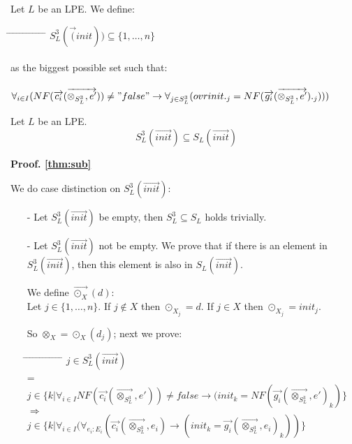 \index{}\documentclass[a4paper,10pt]{article}
\theoremstyle{plain}
\theoremstyle{definition}
\newcommand{\ovr}{\overrightarrow}
\newcommand{\tb}{\textbf}
\newcommand{\tab}{\hspace*{5.mm} \= \hspace*{5.mm} \= \hspace*{5.mm} \= \hspace*{5.mm} \= \hspace*{5.mm} \= \hspace*{5.mm}  \= \hspace*{5.mm}  \= \hspace*{5.mm}  \= \hspace*{5.mm} \= \hspace*{5.mm} \= \hspace*{5.mm}  \= \hspace*{5.mm}  \= \hspace*{5.mm}\kill}
\begin{document}
\begin{defn} \label{def:sug3} Let $L$ be an LPE. We define:%

\begin{tabbing}
\tab
\> $ S_L^3(\ovr(init)) \subseteq \lbrace 1, \ldots, n \rbrace $ \\ \\
 \> as the biggest possible set such that:\\ \\
\> $\forall_{i \in I} (NF( \ovr{c_i} ( \ovr{\otimes_{S_L^3}, e'} ) ) \not= "false" \rightarrow \forall_{j \in S_L^3}(ovr{init}._j =  NF( \ovr{g_i}(\ovr{\otimes_{S_L^3}, e'} )._j))) $
\end{tabbing}
\begin{thm} Let $L$ be an LPE. \label{thm:sub}
$$S_L^3(\ovr{init}) \subseteq S_L(\ovr{init}) $$
\end{thm} 
\begin{flushleft}
\tb{Proof. \ref{thm:sub}}
\end{flushleft}
We do case distinction on $S_L^3(\ovr{init})$:\\
\begin{itemize}
\item[-] Let $S_L^3(\ovr{init})$ be empty, then $S_L^3 \subseteq S_L$ holds trivially.
\item[-] Let $S_L^3(\ovr{init})$ not be empty. We prove that if there is an element in $S_L^3(\ovr{init})$, then this element is also in $S_L(\ovr{init})$.
\begin{defn} We define $\ovr{\odot_X}(d)$:\\
Let $j \in \lbrace 1, \dots, n \rbrace $. 
If $j \not\in X$ then $\odot_{X_j} = d$. 
If $j \in X$ then $\odot_{X_j} = init_j$.
\end{defn}
So $\otimes_X = \odot_X(d_j)$; next we prove:
\begin{tabbing}
\tab
\> \> $j \in S_L^3(\ovr{init})$\\
\> = \> \> \\
\> \> $j \in \lbrace k \vert \forall_{i \in I} NF(\ovr{c_i}( \ovr{\otimes_{S_L^3}}, e')) \neq false \rightarrow (init_k = NF(\ovr{g_i} (\ovr{\otimes_{S_L^3}}, e' )_k)  \rbrace$\\
\> $\Rightarrow$ \> \> \\
\> \> $j \in \lbrace k \vert \forall_{i \in I} (\forall_{e_i:E_i} (\ovr{c_i}( \ovr{\otimes_{S_L^3}}, e_i) \rightarrow (init_k = \ovr{g_i} (\ovr{\otimes_{S_L^3}}, e_i )_k))  \rbrace$\\

\end{tabbing}
\end{itemize}
\end{defn}
\end{document}
